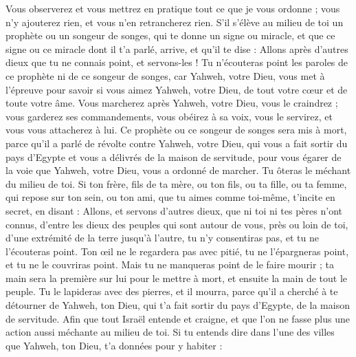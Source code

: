 \begin{multicols}{2}
Vous observerez et vous mettrez en pratique tout ce que je vous ordonne ; vous n'y ajouterez rien, et vous n'en retrancherez rien.
\VerseOne{}S'il s'élève au milieu de toi un prophète ou un songeur de songes, qui te donne un signe ou miracle,
et que ce signe ou ce miracle dont il t’a parlé, arrive, et qu’il te dise : Allons après d'autres dieux que tu ne connais point, et servons-les !
Tu n'écouteras point les paroles de ce prophète ni de ce songeur de songes, car Yahweh, votre Dieu, vous met à l’épreuve pour savoir si vous aimez Yahweh, votre Dieu, de tout votre cœur et de toute votre âme.
Vous marcherez après Yahweh, votre Dieu, vous le craindrez ; vous garderez ses commandements, vous obéirez à sa voix, vous le servirez, et vous vous attacherez à lui.
Ce prophète ou ce songeur de songes sera mis à mort, parce qu'il a parlé de révolte contre Yahweh, votre Dieu, qui vous a fait sortir du pays d'Egypte et vous a délivrés de la maison de servitude, pour vous égarer de la voie que Yahweh, votre Dieu, vous a ordonné de marcher. Tu ôteras le méchant du milieu de toi.
Si ton frère, fils de ta mère, ou ton fils, ou ta fille, ou ta femme, qui repose sur ton sein, ou ton ami, que tu aimes comme toi-même, t'incite en secret, en disant : Allons, et servons d'autres dieux, que ni toi ni tes pères n’ont connus,
d'entre les dieux des peuples qui sont autour de vous, près ou loin de toi, d’une extrémité de la terre jusqu'à l'autre,
tu n’y consentiras pas, et tu ne l'écouteras point. Ton œil ne le regardera pas avec pitié, tu ne l’épargneras point, et tu ne le couvriras point.
Mais tu ne manqueras point de le faire mourir ; ta main sera la première sur lui pour le mettre à mort, et ensuite la main de tout le peuple.
Tu le lapideras avec des pierres, et il mourra, parce qu'il a cherché à te détourner de Yahweh, ton Dieu, qui t'a fait sortir du pays d'Egypte, de la maison de servitude.
Afin que tout Israël entende et craigne, et que l'on ne fasse plus une action aussi méchante au milieu de toi.
Si tu entends dire dans l'une des villes que Yahweh, ton Dieu, t’a données pour y habiter :

\end{multicols}
